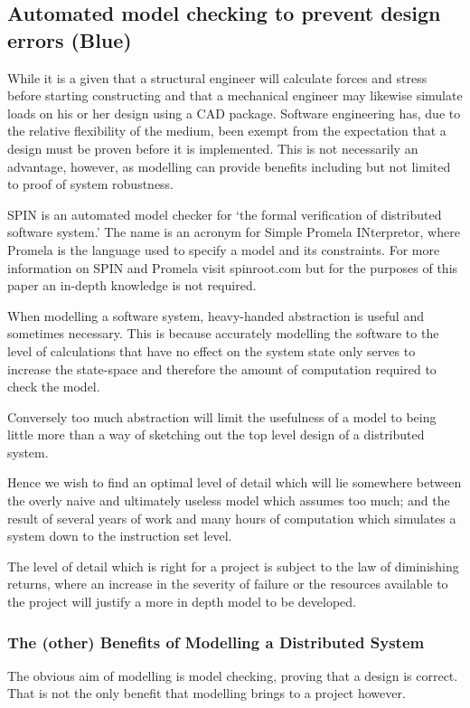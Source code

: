 \subsection{Automated model checking to prevent design errors (Blue)}
While it is a given that a structural engineer will calculate forces and stress before
starting constructing and that a mechanical engineer may likewise simulate loads
on his or her design using a CAD package. Software engineering has,
due to the relative flexibility of the medium, been exempt from the expectation
 that a design must be proven before it is implemented. This is not 
 necessarily an advantage, however, as modelling can provide benefits
 including but not limited to proof of system robustness.

SPIN is an automated model checker for `the formal verification of
distributed software system.'\cite{spinroot} The name is an acronym for
Simple Promela INterpretor, where Promela is the language used to 
specify a model and its constraints. For more information on SPIN and
Promela visit spinroot.com but for the purposes of this paper an in-depth
knowledge is not required.

When modelling a software system, heavy-handed abstraction is useful
and sometimes necessary. This is because accurately modelling the software
to the level of calculations that have no effect on the system state only 
serves to increase the state-space and therefore the amount of computation
required to check the model. 

Conversely too much abstraction will limit the usefulness of a model to 
being little more than a way of sketching out the top level design of a 
distributed system.

Hence we wish to find an optimal level of detail  which will lie somewhere between the overly 
naive and ultimately useless model which assumes too much; and the result
of several years of work and many hours of computation which simulates
a system down to the instruction set level. 

The level of detail which is right for a project is subject to the law of diminishing
returns, where an increase in the severity of failure or the resources available to
the project will justify a more in depth model to be developed. 

\subsubsection{The (other) Benefits of Modelling a Distributed System}
The obvious aim of modelling is model checking, proving that a design is
correct. That is not the only benefit that modelling brings to a project
however. 

